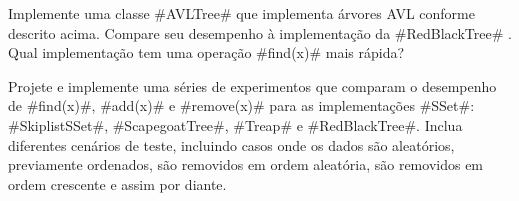 \begin{exc}
  Implemente uma classe #AVLTree# que implementa árvores AVL conforme descrito acima. Compare seu desempenho à implementação da 
  #RedBlackTree# . Qual implementação tem uma operação #find(x)# mais rápida?
\end{exc}

\begin{exc}
  Projete e implemente uma séries de experimentos que comparam o desempenho de 
  #find(x)#, #add(x)# e #remove(x)# para as implementações #SSet#: #SkiplistSSet#,
  #ScapegoatTree#, #Treap# e #RedBlackTree#.  Inclua diferentes cenários de teste, incluindo casos onde os dados são aleatórios, previamente ordenados, são removidos em ordem aleatória, são removidos em ordem crescente e assim por diante. 
\end{exc}
